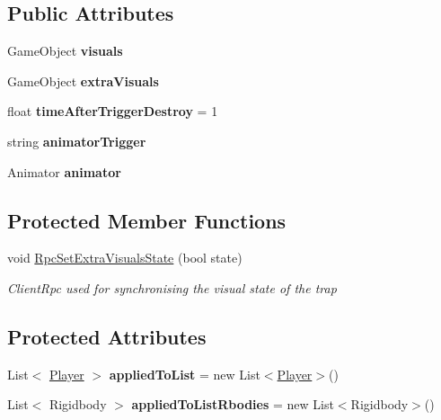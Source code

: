 \subsection*{Public Attributes}
\begin{DoxyCompactItemize}
\item 
\hypertarget{class_trap_a7ac93c16d13c44d05c3bea6ebd7bb1d6}{}\label{class_trap_a7ac93c16d13c44d05c3bea6ebd7bb1d6} 
Game\+Object {\bfseries visuals}
\item 
\hypertarget{class_trap_a1ba57f23229527b9d36a4ceaf4cbb41c}{}\label{class_trap_a1ba57f23229527b9d36a4ceaf4cbb41c} 
Game\+Object {\bfseries extra\+Visuals}
\item 
\hypertarget{class_trap_a4273a05002bf9c79b044ed44b32e4095}{}\label{class_trap_a4273a05002bf9c79b044ed44b32e4095} 
float {\bfseries time\+After\+Trigger\+Destroy} = 1
\item 
\hypertarget{class_trap_a165a38325fbd63be54d90ecc3158679a}{}\label{class_trap_a165a38325fbd63be54d90ecc3158679a} 
string {\bfseries animator\+Trigger}
\item 
\hypertarget{class_trap_ae5c79e9ffe16d99a44f526ffa6694039}{}\label{class_trap_ae5c79e9ffe16d99a44f526ffa6694039} 
Animator {\bfseries animator}
\end{DoxyCompactItemize}
\subsection*{Protected Member Functions}
\begin{DoxyCompactItemize}
\item 
void \hyperlink{class_trap_acd3eda72aa05132de5ae7907f277261f}{Rpc\+Set\+Extra\+Visuals\+State} (bool state)
\begin{DoxyCompactList}\small\item\em Client\+Rpc used for synchronising the visual state of the trap \end{DoxyCompactList}\end{DoxyCompactItemize}
\subsection*{Protected Attributes}
\begin{DoxyCompactItemize}
\item 
\hypertarget{class_trap_a78b383644b715f4ef834ab4ec42d7b01}{}\label{class_trap_a78b383644b715f4ef834ab4ec42d7b01} 
List$<$ \hyperlink{class_player}{Player} $>$ {\bfseries applied\+To\+List} = new List$<$\hyperlink{class_player}{Player}$>$()
\item 
\hypertarget{class_trap_a0d33b89483eb7aafdbdae4e4c8600799}{}\label{class_trap_a0d33b89483eb7aafdbdae4e4c8600799} 
List$<$ Rigidbody $>$ {\bfseries applied\+To\+List\+Rbodies} = new List$<$Rigidbody$>$()
\end{DoxyCompactItemize}


